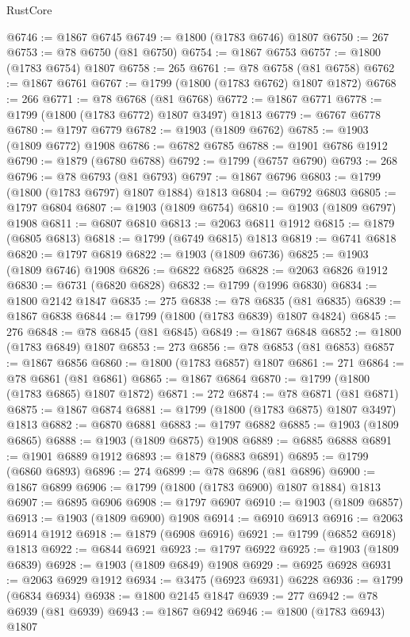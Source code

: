 \begin{lexlean}{RustCore}
\begin{coremodule}
@6746 := @1867 @6745
@6749 := @1800 (@1783 @6746) @1807
@6750 := 267
@6753 := @78 @6750 (@81 @6750)
@6754 := @1867 @6753
@6757 := @1800 (@1783 @6754) @1807
@6758 := 265
@6761 := @78 @6758 (@81 @6758)
@6762 := @1867 @6761
@6767 := @1799 (@1800 (@1783 @6762) @1807 @1872)
@6768 := 266
@6771 := @78 @6768 (@81 @6768)
@6772 := @1867 @6771
@6778 := @1799 (@1800 (@1783 @6772) @1807 @3497) @1813
@6779 := @6767 @6778
@6780 := @1797 @6779
@6782 := @1903 (@1809 @6762)
@6785 := @1903 (@1809 @6772) @1908
@6786 := @6782 @6785
@6788 := @1901 @6786 @1912
@6790 := @1879 (@6780 @6788)
@6792 := @1799 (@6757 @6790)
@6793 := 268
@6796 := @78 @6793 (@81 @6793)
@6797 := @1867 @6796
@6803 := @1799 (@1800 (@1783 @6797) @1807 @1884) @1813
@6804 := @6792 @6803
@6805 := @1797 @6804
@6807 := @1903 (@1809 @6754)
@6810 := @1903 (@1809 @6797) @1908
@6811 := @6807 @6810
@6813 := @2063 @6811 @1912
@6815 := @1879 (@6805 @6813)
@6818 := @1799 (@6749 @6815) @1813
@6819 := @6741 @6818
@6820 := @1797 @6819
@6822 := @1903 (@1809 @6736)
@6825 := @1903 (@1809 @6746) @1908
@6826 := @6822 @6825
@6828 := @2063 @6826 @1912
@6830 := @6731 (@6820 @6828)
@6832 := @1799 (@1996 @6830)
@6834 := @1800 @2142 @1847
@6835 := 275
@6838 := @78 @6835 (@81 @6835)
@6839 := @1867 @6838
@6844 := @1799 (@1800 (@1783 @6839) @1807 @4824)
@6845 := 276
@6848 := @78 @6845 (@81 @6845)
@6849 := @1867 @6848
@6852 := @1800 (@1783 @6849) @1807
@6853 := 273
@6856 := @78 @6853 (@81 @6853)
@6857 := @1867 @6856
@6860 := @1800 (@1783 @6857) @1807
@6861 := 271
@6864 := @78 @6861 (@81 @6861)
@6865 := @1867 @6864
@6870 := @1799 (@1800 (@1783 @6865) @1807 @1872)
@6871 := 272
@6874 := @78 @6871 (@81 @6871)
@6875 := @1867 @6874
@6881 := @1799 (@1800 (@1783 @6875) @1807 @3497) @1813
@6882 := @6870 @6881
@6883 := @1797 @6882
@6885 := @1903 (@1809 @6865)
@6888 := @1903 (@1809 @6875) @1908
@6889 := @6885 @6888
@6891 := @1901 @6889 @1912
@6893 := @1879 (@6883 @6891)
@6895 := @1799 (@6860 @6893)
@6896 := 274
@6899 := @78 @6896 (@81 @6896)
@6900 := @1867 @6899
@6906 := @1799 (@1800 (@1783 @6900) @1807 @1884) @1813
@6907 := @6895 @6906
@6908 := @1797 @6907
@6910 := @1903 (@1809 @6857)
@6913 := @1903 (@1809 @6900) @1908
@6914 := @6910 @6913
@6916 := @2063 @6914 @1912
@6918 := @1879 (@6908 @6916)
@6921 := @1799 (@6852 @6918) @1813
@6922 := @6844 @6921
@6923 := @1797 @6922
@6925 := @1903 (@1809 @6839)
@6928 := @1903 (@1809 @6849) @1908
@6929 := @6925 @6928
@6931 := @2063 @6929 @1912
@6934 := @3475 (@6923 @6931) @6228
@6936 := @1799 (@6834 @6934)
@6938 := @1800 @2145 @1847
@6939 := 277
@6942 := @78 @6939 (@81 @6939)
@6943 := @1867 @6942
@6946 := @1800 (@1783 @6943) @1807

\end{coremodule}
\end{lexlean}
